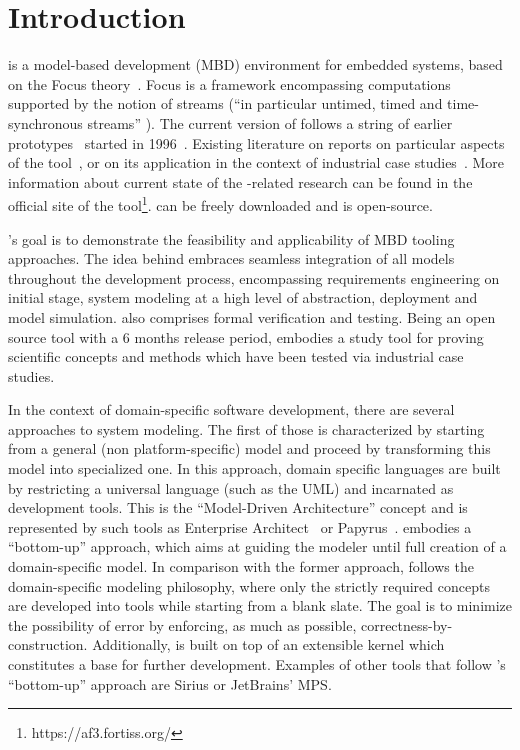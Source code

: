 \section{Introduction}

\autofocus is a model-based development (MBD) environment for embedded systems,
based on the \textsf{Focus} theory~\cite{Broy:2001:SDI:374869}. \textsf{Focus} is a framework
encompassing computations supported by the notion of streams (“in particular
untimed, timed and time-synchronous streams”
\cite{Holzl:2007:AST:1927558.1927576}). The current version of \af follows a
string of earlier
prototypes~\cite{Holzl:2007:AST:1927558.1927576,DBLP:conf/models/AravantinosVTHS15}
started in 1996~\cite{Huber96autofocus--}. Existing literature on \af reports on particular aspects of the
tool~\cite{TMR2013,TMR2011,Lucio:17,DBLP:conf/se/VossEH14,Barner2016,Diewald2016,Carlan2017},
or on its application in the context of industrial case
studies~\cite{2009-a-top-down-methodology-for-the-development-of-automotive-software,2011KeylessEntry,Bohm:2014:FSE:2593850.2593856,DBLP:conf/models/AravantinosVTHS15,Barner2017,Eder2017}.
More information about current state of the \af-related research can be found in
the official site of the tool\footnote{ https://af3.fortiss.org/}. \af can be
freely downloaded and is open-source.

\af's goal is to demonstrate the feasibility and applicability of
MBD tooling approaches. The idea behind \af embraces seamless integration of all models throughout the
development process, encompassing requirements engineering on initial stage, system
modeling at a high level of abstraction, deployment and model simulation. \af
also comprises formal verification and testing. Being an open source tool with a 6 months
release period, \af embodies a study tool for proving scientific concepts and
methods which have been tested via industrial case studies.

In the context of domain-specific software development, there are several
approaches to system modeling. The first of those is characterized by starting from a general
(non platform-specific) model and proceed by transforming this model into
specialized one. In this approach, domain specific languages are built by
restricting a universal language (such as the UML) and incarnated as development
tools. This is the “Model-Driven Architecture” concept and is represented by
such tools as Enterprise Architect~\cite{SparxSystems} or
Papyrus~\cite{Papyrus}. \af embodies a “bottom-up” approach, which aims at
guiding the modeler until full creation of a domain-specific model.
In comparison with the former approach, \af follows the domain-specific modeling
philosophy, where only the strictly required concepts are developed into tools while starting
from a blank slate. The goal is to minimize the possibility of error by
enforcing, as much as possible, correctness-by-construction. Additionally, \af
is built on top of an extensible kernel which constitutes a base for further
development. Examples of other tools that follow \af's ``bottom-up'' approach are
Sirius\cite{Sirius} or JetBrains' MPS\cite{MPS}.

